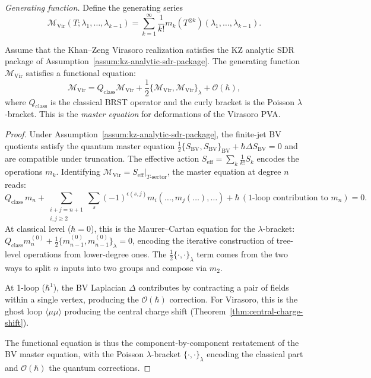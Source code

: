 \medskip
\noindent\emph{Generating function.}
Define the generating series
\begin{equation}
\label{eq:vir-gen-func}
\mathcal{M}_{\text{Vir}}(T; \lambda_1, \ldots, \lambda_{k-1}) = \sum_{k=1}^\infty \frac{1}{k!} m_k(T^{\otimes k})(\lambda_1, \ldots, \lambda_{k-1}).
\end{equation}

\begin{theorem}
\label{thm:vir-recursive}
Assume that the Khan--Zeng Virasoro realization satisfies the KZ
analytic SDR package of
Assumption~\textup{\ref{assum:kz-analytic-sdr-package}}.
The generating function $\mathcal{M}_{\text{Vir}}$ satisfies a functional equation:
\begin{equation}
\mathcal{M}_{\text{Vir}} = Q_{\text{class}} \mathcal{M}_{\text{Vir}} + \frac{1}{2} \{\mathcal{M}_{\text{Vir}}, \mathcal{M}_{\text{Vir}}\}_\lambda + \mathcal{O}(\hbar),
\end{equation}
where $Q_{\text{class}}$ is the classical BRST operator and the curly bracket is the Poisson $\lambda$-bracket. This is the \emph{master equation} for deformations of the Virasoro PVA.
\end{theorem}

\begin{proof}
Under Assumption~\ref{assum:kz-analytic-sdr-package}, the finite-jet
BV quotients satisfy the quantum master equation
$\tfrac{1}{2}\{S_{\mathrm{BV}}, S_{\mathrm{BV}}\}_{\mathrm{BV}}
+ \hbar\Delta S_{\mathrm{BV}} = 0$ and are compatible under
truncation. The effective action
$S_{\mathrm{eff}} = \sum_k \frac{1}{k!} S_k$ encodes the operations
$m_k$. Identifying
$\mathcal{M}_{\mathrm{Vir}} = S_{\mathrm{eff}}|_{T\text{-sector}}$,
the master equation at degree $n$ reads:
\[
Q_{\mathrm{class}}\, m_n + \sum_{\substack{i+j=n+1\\i,j\ge 2}} \sum_{s} (-1)^{\epsilon(s,j)} m_i(\ldots, m_j(\ldots), \ldots) + \hbar\,(\text{1-loop contribution to } m_n) = 0.
\]
At classical level ($\hbar = 0$), this is the Maurer--Cartan equation for the $\lambda$-bracket: $Q_{\mathrm{class}} m_n^{(0)} + \frac{1}{2}\{m_{n-1}^{(0)}, m_{n-1}^{(0)}\}_\lambda = 0$, encoding the iterative construction of tree-level operations from lower-degree ones. The $\frac{1}{2}\{\cdot, \cdot\}_\lambda$ term comes from the two ways to split $n$ inputs into two groups and compose via $m_2$.

At 1-loop ($\hbar^1$), the BV Laplacian $\Delta$ contributes by contracting a pair of fields within a single vertex, producing the $\mathcal{O}(\hbar)$ correction. For Virasoro, this is the ghost loop $\langle\mu\mu\rangle$ producing the central charge shift (Theorem~\ref{thm:central-charge-shift}).

The functional equation is thus the component-by-component restatement of the BV master equation, with the Poisson $\lambda$-bracket $\{\cdot, \cdot\}_\lambda$ encoding the classical part and $\mathcal{O}(\hbar)$ the quantum corrections.
\end{proof}

